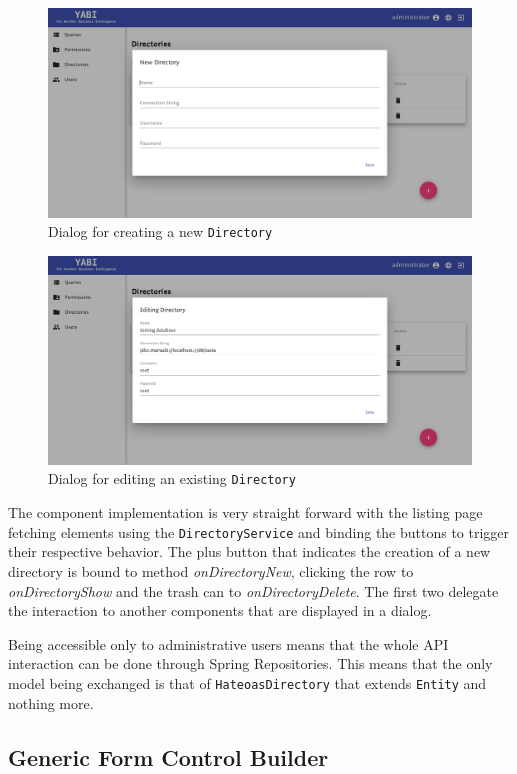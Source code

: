 \begin{figure}
  \centering
  \includegraphics[width=.8\textwidth]{images/screenshots/directory/directory-new}
  \caption{Dialog for creating a new \texttt{Directory}}\label{fig:dirnew}
\end{figure}

\begin{figure}
  \centering
  \includegraphics[width=.8\textwidth]{images/screenshots/directory/directory-edit}
  \caption{Dialog for editing an existing \texttt{Directory}}\label{fig:diredit}
\end{figure}

The component implementation is very straight forward with the listing page fetching elements using the \texttt{DirectoryService} and binding the buttons to trigger their respective behavior. The plus button that indicates the creation of a new directory is bound to method \textit{onDirectoryNew}, clicking the row to \textit{onDirectoryShow} and the trash can to \textit{onDirectoryDelete}. The first two delegate the interaction to another components that are displayed in a dialog. 

Being accessible only to administrative users means that the whole \gls{API} interaction can be done through Spring Repositories. This means that the only model being exchanged is that of \texttt{HateoasDirectory} that extends \texttt{Entity} and nothing more.

\subsection{Generic Form Control Builder}


